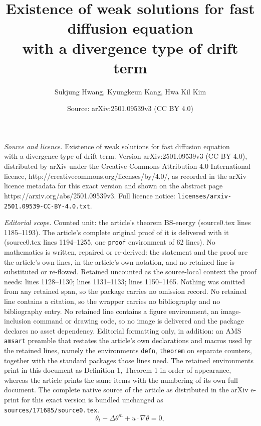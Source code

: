 \documentclass[10pt,a4paper]{amsart}
\title{Existence of weak solutions for fast diffusion equation \\ with a divergence type of drift term}
\author{Sukjung Hwang, Kyungkeun Kang, Hwa Kil Kim}
\date{Source: arXiv:2501.09539v3 (CC BY 4.0)}
\begin{document}
\maketitle

\noindent\emph{Source and licence.} Existence of weak solutions for fast diffusion equation \\ with a divergence type of drift term. Version arXiv:2501.09539v3 (CC BY 4.0), distributed by arXiv under the Creative Commons Attribution 4.0 International licence, http://creativecommons.org/licenses/by/4.0/, as recorded in the arXiv licence metadata for this exact version and shown on the abstract page https://arxiv.org/abs/2501.09539v3. Full licence notice: \texttt{licenses/arxiv-2501.09539-CC-BY-4.0.txt}.\par\smallskip

\noindent\textit{Editorial scope.} Counted unit: the article's theorem BS-energy (source0.tex lines 1185--1193). The article's complete original proof of it is delivered with it (source0.tex lines 1194--1255, one \texttt{proof} environment of 62 lines). No mathematics is written, repaired or re-derived: the statement and the proof are the article's own lines, in the article's own notation, and no retained line is substituted or re-flowed.  Retained uncounted as the source-local context the proof needs: lines 1128--1130; lines 1131--1133; lines 1150--1165.  Nothing was omitted from any retained span, so the package carries no omission record.  No retained line contains a citation, so the wrapper carries no bibliography and no bibliography entry.  No retained line contains a figure environment, an image-inclusion command or drawing code, so no image is delivered and the package declares no asset dependency.  Editorial formatting only, in addition: an AMS \texttt{amsart} preamble that restates the article's own declarations and macros used by the retained lines, namely the environments \texttt{defn}, \texttt{theorem} on separate counters, together with the standard packages those lines need.  The retained environments print in this document as Definition 1, Theorem 1 in order of appearance, whereas the article prints the same items with the numbering of its own full document.  The complete native source of the article as distributed in the arXiv e-print for this exact version is bundled unchanged as \texttt{sources/171685/source0.tex}.
\begin{equation}\label{BE-10}
\theta_t-\Delta \theta^m +u\cdot \nabla \theta=0,
\end{equation}
\end{document}
